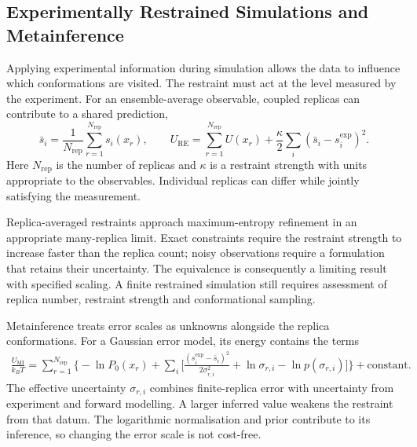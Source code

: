 \subsection{Experimentally Restrained Simulations and Metainference}
\label{sec:bg-restrained-simulation}

Applying experimental information during simulation allows the data to influence which conformations are visited. The restraint must act at the level measured by the experiment. For an ensemble-average observable, coupled replicas can contribute to a shared prediction,
\begin{equation}
    \bar s_i=\frac{1}{N_{\text{rep}}}
    \sum_{r=1}^{N_{\text{rep}}}s_i(x_r),
    \qquad
    U_{\text{RE}}=\sum_{r=1}^{N_{\text{rep}}}U(x_r)
    +\frac{\kappa}{2}\sum_i(\bar s_i-s_i^{\text{exp}})^2.
    \label{eq:bg-replica-restraint}
\end{equation}
Here $N_{\text{rep}}$ is the number of replicas and $\kappa$ is a restraint strength with units appropriate to the observables. Individual replicas can differ while jointly satisfying the measurement.\supercite{cesariUsingMaximumEntropy2018,hummerBayesianEnsembleRefinement2015}

Replica-averaged restraints approach maximum-entropy refinement in an appropriate many-replica limit. Exact constraints require the restraint strength to increase faster than the replica count; noisy observations require a formulation that retains their uncertainty.\supercite{cesariUsingMaximumEntropy2018} The equivalence is consequently a limiting result with specified scaling. A finite restrained simulation still requires assessment of replica number, restraint strength and conformational sampling.

Metainference treats error scales as unknowns alongside the replica conformations. For a Gaussian error model, its energy contains the terms
\begin{equation}
    \begin{split}
    \frac{U_{\text{MI}}}{k_BT}
    =\sum_{r=1}^{N_{\text{rep}}}\Bigg\{
    -\ln P_0(x_r)+\sum_i\Bigg[
    \frac{(s_i^{\text{exp}}-\bar s_i)^2}{2\sigma_{r,i}^2}
    +\ln\sigma_{r,i}-\ln p(\sigma_{r,i})
    \Bigg]\Bigg\}+\text{constant}.
    \end{split}
    \label{eq:bg-metainference}
\end{equation}
The effective uncertainty $\sigma_{r,i}$ combines finite-replica error with uncertainty from experiment and forward modelling. A larger inferred value weakens the restraint from that datum. The logarithmic normalisation and prior contribute to its inference, so changing the error scale is not cost-free.\supercite{bonomiMetadynamicMetainferenceEnhanced2016}

